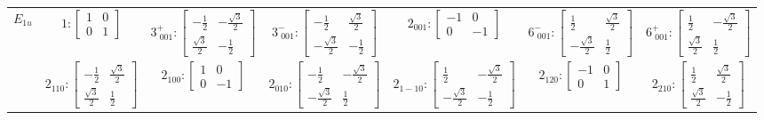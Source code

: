\documentclass[fleqn,8pt,landscape]{jsarticle}
\begin{document}
\begin{longtable}{ccccccc}
$ E_{1u} $ & $ 1:\begin{bmatrix} 1 & 0 \\ 0 & 1 \end{bmatrix} $ & $ 3^{+}_{\,\,001}:\begin{bmatrix} - \frac{1}{2} & - \frac{\sqrt{3}}{2} \\ \frac{\sqrt{3}}{2} & - \frac{1}{2} \end{bmatrix} $ & $ 3^{-}_{\,\,001}:\begin{bmatrix} - \frac{1}{2} & \frac{\sqrt{3}}{2} \\ - \frac{\sqrt{3}}{2} & - \frac{1}{2} \end{bmatrix} $ & $ 2{}_{001}:\begin{bmatrix} -1 & 0 \\ 0 & -1 \end{bmatrix} $ & $ 6^{-}_{\,\,001}:\begin{bmatrix} \frac{1}{2} & \frac{\sqrt{3}}{2} \\ - \frac{\sqrt{3}}{2} & \frac{1}{2} \end{bmatrix} $ & $ 6^{+}_{\,\,001}:\begin{bmatrix} \frac{1}{2} & - \frac{\sqrt{3}}{2} \\ \frac{\sqrt{3}}{2} & \frac{1}{2} \end{bmatrix} $ \\
& $ 2{}_{110}:\begin{bmatrix} - \frac{1}{2} & \frac{\sqrt{3}}{2} \\ \frac{\sqrt{3}}{2} & \frac{1}{2} \end{bmatrix} $ & $ 2{}_{100}:\begin{bmatrix} 1 & 0 \\ 0 & -1 \end{bmatrix} $ & $ 2{}_{010}:\begin{bmatrix} - \frac{1}{2} & - \frac{\sqrt{3}}{2} \\ - \frac{\sqrt{3}}{2} & \frac{1}{2} \end{bmatrix} $ & $ 2{}_{1-10}:\begin{bmatrix} \frac{1}{2} & - \frac{\sqrt{3}}{2} \\ - \frac{\sqrt{3}}{2} & - \frac{1}{2} \end{bmatrix} $ & $ 2{}_{120}:\begin{bmatrix} -1 & 0 \\ 0 & 1 \end{bmatrix} $ & $ 2{}_{210}:\begin{bmatrix} \frac{1}{2} & \frac{\sqrt{3}}{2} \\ \frac{\sqrt{3}}{2} & - \frac{1}{2} \end{bmatrix} $ \\

\end{longtable}
\end{document}
